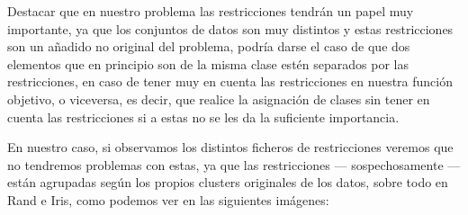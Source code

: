\documentclass[12pt, spanish]{article}
\begin{document}
Destacar que en nuestro problema las restricciones tendrán un papel muy importante, ya que los conjuntos de datos son muy distintos y estas restricciones son un añadido no original del problema, podría darse el caso de que dos elementos que en principio son de la misma clase estén separados por las restricciones, en caso de tener muy en cuenta las restricciones en nuestra función objetivo, o viceversa, es decir, que realice la asignación de clases sin tener en cuenta las restricciones si a estas no se les da la suficiente importancia.

\newpage

En nuestro caso, si observamos los distintos ficheros de restricciones veremos que no tendremos problemas con estas, ya que las restricciones --- sospechosamente --- están agrupadas según los propios clusters originales de los datos, sobre todo en Rand e Iris, como podemos ver en las siguientes imágenes:
\end{document}
